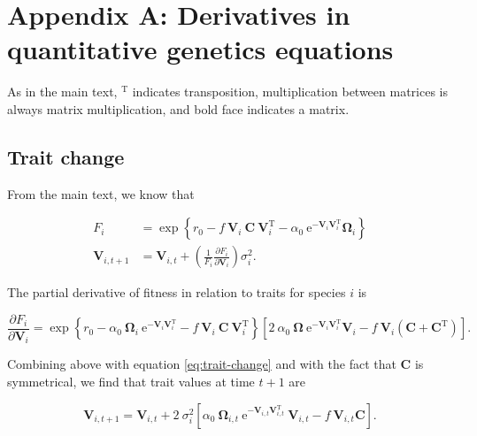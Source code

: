 \section*{Appendix A: Derivatives in quantitative genetics equations}

\renewcommand{\thefigure}{A\arabic{figure}}
\renewcommand{\theequation}{A\arabic{equation}}
\renewcommand{\thetable}{A\arabic{table}}
\setcounter{equation}{0}
\setcounter{figure}{0}
\setcounter{table}{0}


As in the main text, $^{\textrm{T}}$ indicates transposition,
multiplication between matrices is always matrix multiplication, and
bold face indicates a matrix.

\subsection*{Trait change}

From the main text, we know that

\begin{equation*}
\begin{split}
    F_{i} &= \exp \left\{ 
        r_0 - f ~ \mathbf{V}_i ~ \mathbf{C} ~ \mathbf{V}_{i}^{\textrm{T}} -    
        \alpha_0 ~\textrm{e}^{- \mathbf{V}_i \mathbf{V}_i^{\textrm{T}} } \mathbf{\Omega}_{i}
        \right\} \\
    \mathbf{V}_{i,t+1} &= \mathbf{V}_{i,t} + \left( \frac{1}{F_i}
        \frac{\partial F_i}{\partial \mathbf{V}_{i}} \right) \sigma^2_i
    \textrm{.}
\end{split}
\end{equation*}


The partial derivative of fitness in relation to traits for species $i$ is

$$
\frac{ \partial F_i }{ \partial \mathbf{V}_i } =
        \exp \left\{
            r_0 - \alpha_0 ~ \mathbf{\Omega}_i ~
                \textrm{e}^{- \mathbf{V}_i \mathbf{V}_{i}^{\textrm{T}}}
            - f ~ \mathbf{V}_i ~ \mathbf{C} ~ \mathbf{V}_{i}^{\textrm{T}}
        \right\}
        \left[
            2 ~ \alpha_0 ~ \mathbf{\Omega} ~
                \textrm{e}^{- \mathbf{V}_i \mathbf{V}_{i}^{\textrm{T}}}
                \mathbf{V}_i
            - f ~ \mathbf{V}_i (\mathbf{C} + \mathbf{C}^{\textrm{T}})
        \right]
    \textrm{.}
$$

Combining above with equation \ref{eq:trait-change} and with the fact that
$\mathbf{C}$ is symmetrical, we find that trait values at time $t+1$ are

\begin{equation} \label{eq:trait-change-full}
    \mathbf{V}_{i,t+1} = \mathbf{V}_{i,t} + 2 ~ \sigma_i^2
    \left[
        \alpha_0 ~ \mathbf{\Omega}_{i,t} ~
            \textrm{e}^{-\mathbf{V}_{i,t} \mathbf{V}_{i,t}^\textrm{T}} ~ \mathbf{V}_{i,t}
        - f ~ \mathbf{V}_{i,t} \mathbf{C}
    \right]
    \textrm{.}
\end{equation}


